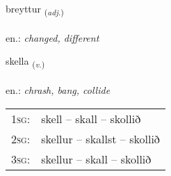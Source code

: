 \documentclass[frontgrid, backgrid]{flacards}\usepackage[]{graphicx}\usepackage[]{xcolor}
\begin{document}
\renewcommand{\flhead}{\vskip5pt \fboxsep=0pt {\small\bfseries\footnotesize Lýsingarorð | Adjective}}
\renewcommand{\fcfoot}{\vskip5pt \fboxsep=0pt \hspace{2pt}{\small\bfseries\footnotesize 2K}}

\renewcommand{\blhead}{\vskip5pt {\small\bfseries\footnotesize Lýsingarorð | Adjective }}
\renewcommand{\bcfoot}{\vskip5pt \hspace{2pt}{\small\bfseries\footnotesize 2K}}


{breyttur \small{\textsubscript{(\textit{adj.})}} \\[1ex] %
\textphonetic{[preihtʏr]} \\
en.: \emph{changed, different} \\  [2ex]
\renewcommand*{\arraystretch}{0.8}
}

\renewcommand{\flhead}{\vskip5pt \fboxsep=0pt {\small\bfseries\footnotesize Sagnorð | Verb}}
\renewcommand{\fcfoot}{\vskip5pt \fboxsep=0pt \hspace{2pt}{\small\bfseries\footnotesize 2K}}

\renewcommand{\blhead}{\vskip5pt {\small\bfseries\footnotesize Sagnorð | Verb }}
\renewcommand{\bcfoot}{\vskip5pt \hspace{2pt}{\small\bfseries\footnotesize 2K}}


{skella \small{\textsubscript{(\textit{v.})}} \\[1ex] %
\textphonetic{[scɛtla]} \\
en.: \emph{chrash, bang, collide} \\  [2ex]
\renewcommand*{\arraystretch}{0.8}
\begin{tabular}{p{1cm}l}
\textsc{1sg}: & skell -- skall -- skollið \\ 
\textsc{2sg}: & skellur -- skallst -- skollið \\ 
\textsc{3sg}: & skellur -- skall -- skollið \\ 
\end{tabular}
}
\end{document}
